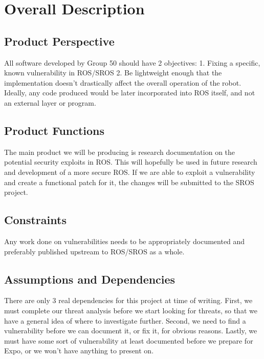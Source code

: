 \documentclass{scrreprt}
\begin{document}
\chapter{Overall Description}

\section{Product Perspective}
All software developed by Group 50 should have 2 objectives:
1. Fixing a specific, known vulnerability in ROS/SROS
2. Be lightweight enough that the implementation doesn't drastically affect the overall operation of the robot. Ideally, any code produced would be later incorporated into ROS itself, and not an external layer or program.

\section{Product Functions}
The main product we will be producing is research documentation on the potential security exploits in ROS.
This will hopefully be used in future research and development of a more secure ROS.
If we are able to exploit a vulnerability and create a functional patch for it, the changes will be submitted to the SROS project.

\section{Constraints}
Any work done on vulnerabilities needs to be appropriately documented and preferably published upstream to ROS/SROS as a whole.

\section{Assumptions and Dependencies}
There are only 3 real dependencies for this project at time of writing. First, we must complete our threat analysis before we start looking for threats,
so that we have a general idea of where to investigate further. Second, we need to find a vulnerability before we can document it, or fix it, for obvious reasons.
Lastly, we must have some sort of vulnerability at least documented before we prepare for Expo, or we won't have anything to present on.
\end{document}
